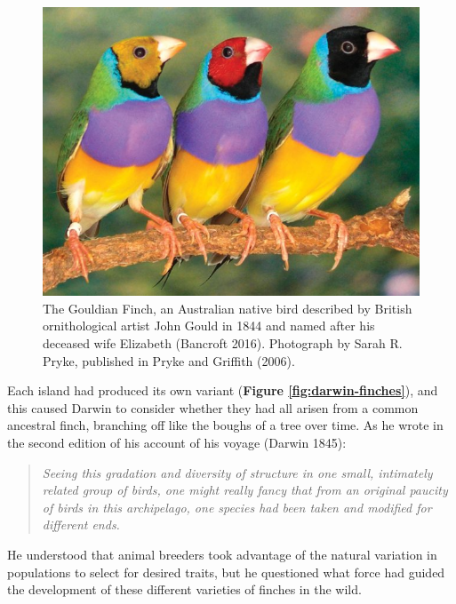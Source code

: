 \documentclass[
]{book}
\begin{document}
\begin{figure}

{\centering \includegraphics[width=1\linewidth]{figs/introduction/gouldian_finch} 

}

\caption{The Gouldian Finch, an Australian native bird described by British ornithological artist John Gould in 1844 and named after his deceased wife Elizabeth (Bancroft 2016). Photograph by Sarah R. Pryke, published in Pryke and Griffith (2006).}\label{fig:gouldian-finch}
\end{figure}

Each island had produced its own variant (\textbf{Figure \ref{fig:darwin-finches}}), and this caused Darwin to consider whether they had all arisen from a common ancestral finch, branching off like the boughs of a tree over time. As he wrote in the second edition of his account of his voyage (Darwin 1845):

\begin{quote}
\emph{Seeing this gradation and diversity of structure in one small, intimately related group of birds, one might really fancy that from an original paucity of birds in this archipelago, one species had been taken and modified for different ends.}
\end{quote}

He understood that animal breeders took advantage of the natural variation in populations to select for desired traits, but he questioned what force had guided the development of these different varieties of finches in the wild.
\end{document}
